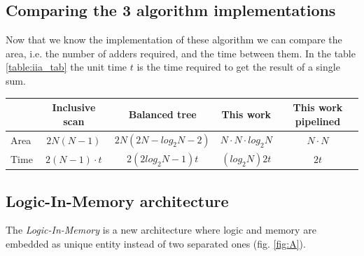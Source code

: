\subsection{Comparing the 3 algorithm implementations}
Now that we know the implementation of these algorithm we can compare the area, i.e. the number of adders required, and the time between them.
In the table \ref{table:iia_tab} the unit time $ t $ is the time required to get the result of a single sum.


\begin{center}
	\begin{tabular}{ | p{1.7cm} | c | c | c | c |}
			
		\hline
		\label{table:iia_tab} & Inclusive scan & Balanced tree & This work & This work pipelined\\
		\hline
		Area & $ 2N(N-1) $ & $ 2N(2N-log_2 N -2) $ & $ N\cdotp N\cdotp log_2 N$ & $ N\cdotp N $\\
		\hline
		Time & $ 2(N-1) \cdotp t $
		& $ 2(2
		log_2 N-1)t $ &
		$ (log_2 N)2t $ & $ 2t $ \\
		\hline
		
	\end{tabular}
\end{center}
\subsection{Logic-In-Memory architecture} \label{sssec:1}
The \textit{Logic-In-Memory} is  a new architecture where logic and memory are embedded as unique entity instead of two separated ones (fig. \ref{fig:A}).

